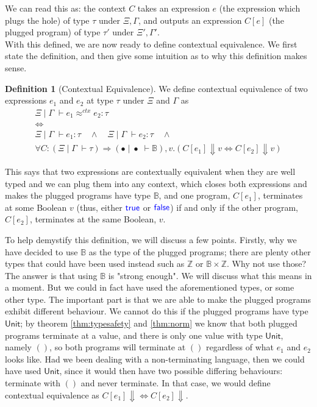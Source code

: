 \documentclass[a4paper, 11pt]{report}
\theoremstyle{definition}
\newtheorem{definition}{Definition}[section]
\newcommand{\Keyword}[1]{{\color{blue} \mathsf{#1}}}
\newcommand{\expr}{e}
\newcommand{\val}{v}
\newcommand{\TT}{()}
\newcommand{\True}{\Keyword{true}}
\newcommand{\False}{\Keyword{false}}
\newcommand{\ctx}{C}
\newcommand{\Tunit}{\mathsf{Unit}}
\newcommand{\Tint}{\mathbb{Z}}
\newcommand{\Tbool}{\mathbb{B}}
\newcommand{\Tprod}[2]{#1 \times #2}
\newcommand{\typ}{\tau}
\newcommand{\venv}{\Gamma}
\newcommand{\tenv}{\Xi}
\newcommand{\emptenv}{\bullet}
\newcommand{\empvenv}{\bullet}
\newcommand{\jdg}[4]{#1 \; | \; #2 \; \vdash #3 : #4}
\newcommand{\jdgType}[3]{#1 \; | \; #2 \; \vdash #3}
\newcommand{\jdgRel}[6]{#1 \; | \; #2 \; \vdash #3 \approx^{#4} #5 : #6}
\newcommand{\ctxRel}[5]{\jdgRel{#1}{#2}{#3}{ctx}{#4}{#5}}
\begin{document}
We can read this as: the context $\ctx$ takes an expression $\expr$ (the expression which plugs the hole) of type $\typ$ under $\tenv, \venv$, and outputs an expression $\ctx[\expr]$ (the plugged program) of type $\typ'$ under $\tenv', \venv'$.\\
With this defined, we are now ready to define contextual equivalence. We first state the definition, and then give some intuition as to why this definition makes sense. 
\begin{definition}[Contextual Equivalence]\label{def:CE}
  We define contextual equivalence of two expressions $\expr_1$ and $\expr_2$ at type $\typ$ under $\tenv$ and $\venv$ as
  \begin{equation*}
    \begin{gathered}
      \ctxRel{\tenv}{\venv}{\expr_1}{\expr_2}{\typ}\\
      \iff\\
      \jdg{\tenv}{\venv}{\expr_1}{\typ} \quad \land \quad
      \jdg{\tenv}{\venv}{\expr_2}{\typ} \quad \land \quad\\
      \forall \ctx : (\jdgType{\tenv}{\venv}{\typ}) \Rightarrow (\jdgType{\emptenv}{\empvenv}{\Tbool}), \val . (\ctx[\expr_1] \Downarrow \val \iff \ctx[\expr_2] \Downarrow \val)
    \end{gathered}
  \end{equation*}
\end{definition}
This says that two expressions are contextually equivalent when they are well typed and we can plug them into any context, which closes both expressions and makes the plugged programs have type $\Tbool$, and one program, $\ctx[\expr_1]$, terminates at some Boolean $\val$ (thus, either $\True$ or $\False$) if and only if the other program, $\ctx[\expr_2]$, terminates at the same Boolean, $\val$.

To help demystify this definition, we will discuss a few points. Firstly, why we have decided to use $\Tbool$ as the type of the plugged programs; there are plenty other types that could have been used instead such as $\Tint$ or $\Tprod{\Tbool}{\Tint}$. Why not use those? The answer is that using $\Tbool$ is "strong enough". We will discuss what this means in a moment. But we could in fact have used the aforementioned types, or some other type. The important part is that we are able to make the plugged programs exhibit different behaviour. We cannot do this if the plugged programs have type $\Tunit$; by theorem \ref{thm:typesafety} and \ref{thm:norm} we know that both plugged programs terminate at a value, and there is only one value with type $\Tunit$, namely $\TT$, so both programs will terminate at $\TT$ regardless of what $\expr_1$ and $\expr_2$ looks like. Had we been dealing with a non-terminating language, then we could have used $\Tunit$, since it would then have two possible differing behaviours: terminate with $\TT$ and never terminate. In that case, we would define contextual equivalence as $\ctx[\expr_1] \Downarrow \iff \ctx[\expr_2] \Downarrow$.
\end{document}
